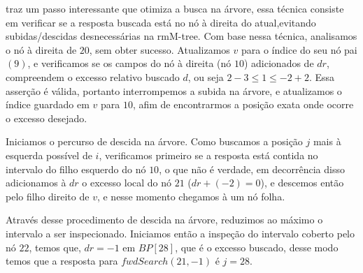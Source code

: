 \begin{example}
        \citet{book-compact-data-structures} traz um passo interessante que otimiza a busca na árvore, essa técnica consiste em  verificar se a resposta buscada está no nó à direita do atual,evitando subidas/descidas desnecessárias na rmM-tree. Com base nessa técnica, analisamos o nó à direita de $20$, sem obter sucesso. Atualizamos  $v$ para o índice do seu nó pai $(9)$, e verificamos se os campos do nó à direita (nó $10$) adicionados de $dr$, compreendem o excesso relativo buscado $d$, ou seja $2 -3 \leq 1 \leq -2 +2$. Essa asserção é válida, portanto interrompemos a subida na árvore, e atualizamos o índice guardado em $v$ para $10$, afim de encontrarmos a posição exata onde ocorre o excesso desejado. 
        
        Iniciamos o percurso de descida na árvore. Como buscamos a posição $j$ mais à esquerda possível de $i$, verificamos primeiro se a resposta está contida no intervalo do filho esquerdo do nó $10$, o que não é verdade, em decorrência disso adicionamos à $dr$ o excesso local do nó $21$ ($dr + (-2)= 0$), e descemos então pelo filho direito de $v$, e nesse momento chegamos à um nó folha.
         
         Através desse procedimento de descida na árvore, reduzimos ao máximo o intervalo a ser inspecionado. Iniciamos então a inspeção do intervalo coberto pelo nó $22$, temos que, $dr=-1$ em $BP[28]$, que é o excesso buscado, desse modo temos que a resposta para $fwdSearch(21,-1)$ é $j=28$.
    \end{example}
    

